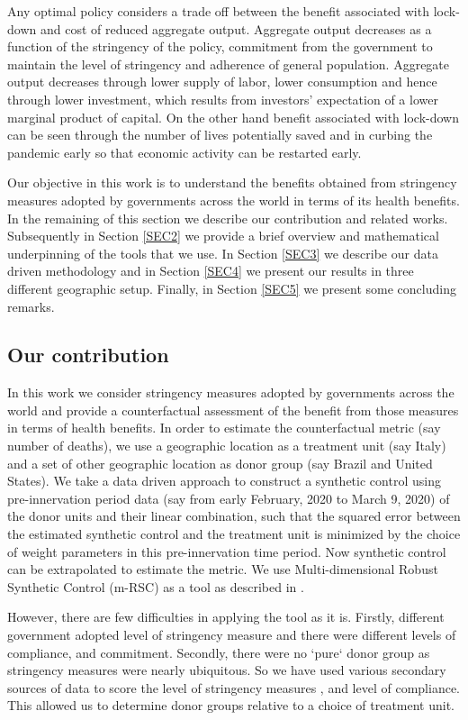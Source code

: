 \documentclass[preprint,authoryear,12pt]{elsarticle}
\begin{document}
	Any optimal policy considers a trade off between the benefit associated with lock-down and cost of reduced aggregate output. Aggregate output decreases as a function of the stringency of the policy, commitment from the government to maintain the level of stringency and adherence of general population. Aggregate output decreases through lower supply of labor, lower consumption and hence through lower investment, which results from investors’ expectation of a lower marginal product of capital. On the other hand benefit associated with lock-down can be seen through the number of lives potentially saved and in curbing the pandemic early so that economic activity can be restarted early. 
	
	Our objective in this work is to understand the benefits obtained from stringency measures adopted by governments across the world in terms of its health benefits. In the remaining of this section we describe our contribution and related  works. Subsequently in Section \ref{SEC2} we provide a brief overview and mathematical underpinning of the tools that we use. In Section \ref{SEC3} we describe our data driven methodology and in Section \ref{SEC4} we present our results in three different geographic setup. Finally, in Section \ref{SEC5} we present some concluding remarks.
	
	\subsection{Our contribution}
	In this work we consider stringency measures adopted by governments across the world and provide a counterfactual assessment of the benefit from those measures in terms of health benefits. In order to estimate the counterfactual metric (say number of deaths), we use a geographic location as a treatment unit (say Italy) and a set of other geographic location as donor group (say Brazil and United States). We take a data driven approach to construct a synthetic control \cite{ap08746, JMLR18, AMSS19} using pre-innervation period data (say from early February, 2020 to March 9, 2020) of the donor units and their linear combination, such that the squared error between the estimated synthetic control  and the treatment unit is minimized by the choice of weight parameters in this pre-innervation time period. Now synthetic control can be extrapolated to estimate the metric. We use Multi-dimensional Robust Synthetic Control (m-RSC) as a tool as described in \cite{AMSS19}. 
	
	However, there are few difficulties  in applying the tool as it is.  Firstly, different government adopted level of stringency measure and there were different levels of compliance, and commitment. Secondly, there were no `pure` donor group as stringency measures were nearly ubiquitous. So we have used various secondary sources of data to score the level of stringency measures , and level of compliance. This allowed us to determine donor groups relative to a choice of treatment unit.
	
\end{document}
